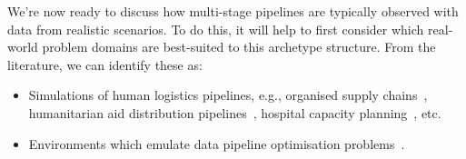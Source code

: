 We're now ready to discuss how multi-stage pipelines are typically observed with data from realistic scenarios. To do this, it will help to first consider which real-world problem domains are best-suited to this archetype structure. From the literature, we can identify these as:
\begin{itemize}
\item{Simulations of human logistics pipelines, e.g., organised supply chains~\cite{yan2022reinforcement}, humanitarian aid distribution pipelines~\cite{yu2021reinforcement}, hospital capacity planning~\cite{shuvo2021deep}, etc. }
\item{Environments which emulate data pipeline optimisation problems~\cite{nagrecha2023intune}.}
\end{itemize}
